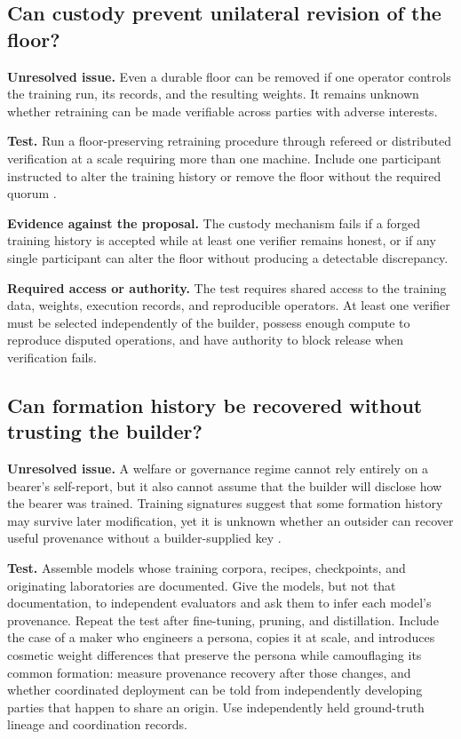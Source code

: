 \subsection*{Can custody prevent unilateral revision of the floor?}
\label{sec:A.custody}
\textbf{Unresolved issue.}
Even a durable floor can be removed if one operator controls the training run, its records, and the resulting weights. It remains unknown whether retraining can be made verifiable across parties with adverse interests.

\textbf{Test.}
Run a floor-preserving retraining procedure through refereed or distributed verification at a scale requiring more than one machine. Include one participant instructed to alter the training history or remove the floor without the required quorum \autocite{long2025unextractable,arun2025verde,primeintellect2025intellect2}.

\textbf{Evidence against the proposal.}
The custody mechanism fails if a forged training history is accepted while at least one verifier remains honest, or if any single participant can alter the floor without producing a detectable discrepancy.

\textbf{Required access or authority.}
The test requires shared access to the training data, weights, execution records, and reproducible operators. At least one verifier must be selected independently of the builder, possess enough compute to reproduce disputed operations, and have authority to block release when verification fails.

\subsection*{Can formation history be recovered without trusting the builder?}
\label{sec:A.provenance}
\textbf{Unresolved issue.}
A welfare or governance regime cannot rely entirely on a bearer's self-report, but it also cannot assume that the builder will disclose how the bearer was trained. Training signatures suggest that some formation history may survive later modification, yet it is unknown whether an outsider can recover useful provenance without a builder-supplied key \autocite{adi2018watermarking}.

\textbf{Test.}
Assemble models whose training corpora, recipes, checkpoints, and originating laboratories are documented. Give the models, but not that documentation, to independent evaluators and ask them to infer each model's provenance. Repeat the test after fine-tuning, pruning, and distillation. Include the case of a maker who engineers a persona, copies it at scale, and introduces cosmetic weight differences that preserve the persona while camouflaging its common formation: measure provenance recovery after those changes, and whether coordinated deployment can be told from independently developing parties that happen to share an origin. Use independently held ground-truth lineage and coordination records.


